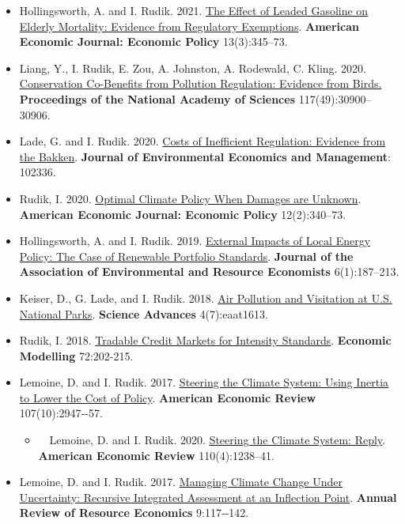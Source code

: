\documentclass[11pt]{res} %
\begin{document}
\begin{resume}
\begin{itemize}
	\item[] Hollingsworth, A. and I. Rudik. 2021. \href{https://osf.io/preprints/socarxiv/rdy6g}{The Effect of Leaded Gasoline on Elderly Mortality: Evidence from Regulatory Exemptions}. \textbf{American Economic Journal: Economic Policy} 13(3):345--73.
	\item[] Liang, Y., I. Rudik, E. Zou, A. Johnston, A. Rodewald, C. Kling. 2020. \href{https://www.pnas.org/content/early/2020/11/23/2013568117}{Conservation Co-Benefits from Pollution Regulation: Evidence from Birds.} \textbf{Proceedings of the National Academy of Sciences} 117(49):30900--30906.
	\item[] Lade, G. and I. Rudik. 2020. \href{https://papers.ssrn.com/sol3/papers.cfm?abstract_id=3086728}{Costs of Inefficient Regulation: Evidence from the Bakken}. \textbf{Journal of Environmental Economics and Management}: 102336.
	\item[] Rudik, I. 2020. \href{https://www.aeaweb.org/articles?id=10.1257/pol.20160541}{Optimal Climate Policy When Damages are Unknown}. \textbf{American Economic Journal: Economic Policy} 12(2):340--73.
	\item[] Hollingsworth, A. and I. Rudik. 2019. \href{http://papers.ssrn.com/sol3/papers.cfm?abstract_id=2697222}{External Impacts of Local Energy Policy: The Case of Renewable Portfolio Standards}. \textbf{Journal of the Association of Environmental and Resource Economists} 6(1):187--213.
	\item[] Keiser, D., G. Lade, and I. Rudik. 2018. \href{http://advances.sciencemag.org/content/4/7/eaat1613}{Air Pollution and Visitation at U.S. National Parks}. \textbf{Science Advances} 4(7):eaat1613.
	\item[] Rudik, I. 2018. \href{https://www.sciencedirect.com/science/article/pii/S0264999317315651}{Tradable Credit Markets for Intensity Standards}. \textbf{Economic Modelling} 72:202-215.
	\item[] Lemoine, D. and I. Rudik. 2017.  \href{http://papers.ssrn.com/sol3/papers.cfm?abstract_id=2443594}{Steering the Climate System: Using Inertia to Lower the Cost of Policy}. \textbf{American Economic Review} 107(10):2947‐-57.
	\begin{itemize}
		\item[] \,\,\,\, Lemoine, D. and I. Rudik. 2020.  \href{http://papers.ssrn.com/sol3/papers.cfm?abstract_id=2443594}{Steering the Climate System: Reply}. \textbf{American Economic Review} 110(4):1238--41.
	\end{itemize}
	\item[] Lemoine, D. and I. Rudik. 2017. \href{https://papers.ssrn.com/sol3/papers.cfm?abstract_id=2862211}{Managing Climate Change Under Uncertainty: Recursive Integrated Assessment at an Inflection Point}.  \textbf{Annual Review of Resource Economics} 9:117‐-142.

\end{itemize}
\end{resume}
\end{document}
